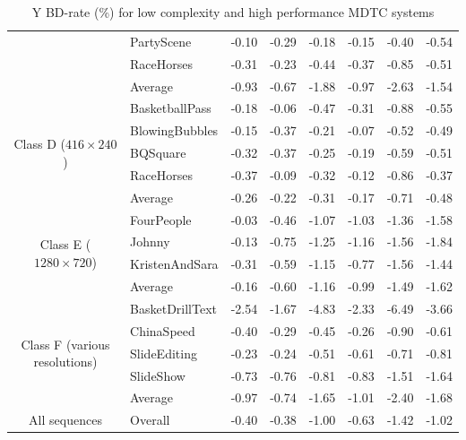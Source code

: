 \documentclass[11pt,a4paper,openright,twoside]{book}
\numberwithin{equation}{section} %
\numberwithin{figure}{section} %
\numberwithin{table}{section} %
\begin{document}
\begin{table}[tb]
\begin{tabularx}{\textwidth}{c|X|rr|rr|rr}
		& PartyScene             & -0.10 & -0.29 & -0.18 & -0.15 & -0.40 & -0.54 \\
		& RaceHorses             & -0.31 & -0.23 & -0.44 & -0.37 & -0.85 & -0.51 \\
		\cline{2-8} &
		Average                  & -0.93 & -0.67 & -1.88 & -0.97 & -2.63 & -1.54 \\
		\hline
		\hline
		\multirow{5}{2cm}{\centering Class D ($416\times240$)}
		& BasketballPass         & -0.18 & -0.06 & -0.47 & -0.31 & -0.88 & -0.55 \\
		& BlowingBubbles         & -0.15 & -0.37 & -0.21 & -0.07 & -0.52 & -0.49 \\
		& BQSquare               & -0.32 & -0.37 & -0.25 & -0.19 & -0.59 & -0.51 \\
		& RaceHorses             & -0.37 & -0.09 & -0.32 & -0.12 & -0.86 & -0.37 \\
		\cline{2-8} &
		Average                  & -0.26 & -0.22 & -0.31 & -0.17 & -0.71 & -0.48 \\
		\hline
		\hline
		\multirow{4}{2cm}{\centering Class E ($1280\times720$)}
		& FourPeople             & -0.03 & -0.46 & -1.07 & -1.03 & -1.36 & -1.58 \\
		& Johnny                 & -0.13 & -0.75 & -1.25 & -1.16 & -1.56 & -1.84 \\
		& KristenAndSara         & -0.31 & -0.59 & -1.15 & -0.77 & -1.56 & -1.44 \\
		\cline{2-8} &
		Average                  & -0.16 & -0.60 & -1.16 & -0.99 & -1.49 & -1.62 \\
		\hline
		\hline
		\multirow{5}{2cm}{\centering Class F (various resolutions)}
		& BasketDrillText        & -2.54 & -1.67 & -4.83 & -2.33 & -6.49 & -3.66 \\
		& ChinaSpeed             & -0.40 & -0.29 & -0.45 & -0.26 & -0.90 & -0.61 \\
		& SlideEditing           & -0.23 & -0.24 & -0.51 & -0.61 & -0.71 & -0.81 \\
		& SlideShow              & -0.73 & -0.76 & -0.81 & -0.83 & -1.51 & -1.64 \\
		\cline{2-8} &
		Average                  & -0.97 & -0.74 & -1.65 & -1.01 & -2.40 & -1.68 \\
		\hline
		\hline
		All sequences &
		Overall                  & -0.40 & -0.38 & -1.00 & -0.63 & -1.42 & -1.02 \\
	\end{tabularx}
	\caption{Y \acs{BD}-rate (\%) for low complexity and high performance \acs{MDTC} systems}
	\label{tab:bd_rate_it}
\end{table}
\end{document}
